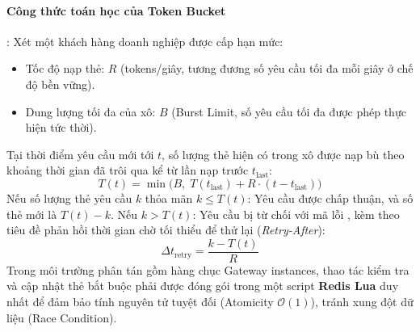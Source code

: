 \paragraph{Công thức toán học của Token Bucket}:
Xét một khách hàng doanh nghiệp được cấp hạn mức:
\begin{itemize}
  \item Tốc độ nạp thẻ: $R$ (tokens/giây, tương đương số yêu cầu tối đa mỗi giây ở chế độ bền vững).
  \item Dung lượng tối đa của xô: $B$ (Burst Limit, số yêu cầu tối đa được phép thực hiện tức thời).
\end{itemize}
Tại thời điểm yêu cầu mới tới $t$, số lượng thẻ hiện có trong xô được nạp bù theo khoảng thời gian đã trôi qua kể từ lần nạp trước $t_{\text{last}}$:
\begin{equation}
T(t) = \min\Big( B, \; T(t_{\text{last}}) + R \cdot (t - t_{\text{last}}) \Big)
\label{eq:token-bucket-refill}
\end{equation}
Nếu số lượng thẻ yêu cầu $k$ thỏa mãn $k \le T(t)$: Yêu cầu được chấp thuận, và số thẻ mới là $T(t) - k$.
Nếu $k > T(t)$: Yêu cầu bị từ chối với mã lỗi , kèm theo tiêu đề phản hồi thời gian chờ tối thiểu để thử lại (\textit{Retry-After}):
\begin{equation}
\Delta t_{\text{retry}} = \frac{k - T(t)}{R}
\label{eq:token-bucket-retry}
\end{equation}
Trong môi trường phân tán gồm hàng chục Gateway instances, thao tác kiểm tra và cập nhật thẻ bắt buộc phải được đóng gói trong một script \textbf{Redis Lua} duy nhất để đảm bảo tính nguyên tử tuyệt đối (Atomicity $\mathcal{O}(1)$), tránh xung đột dữ liệu (Race Condition).


